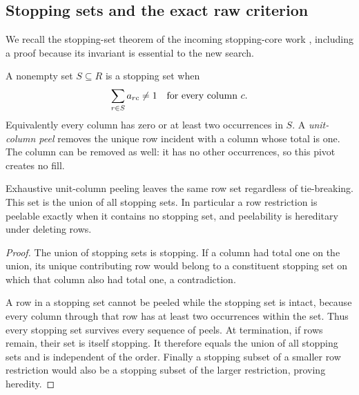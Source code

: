 \subsection{Stopping sets and the exact raw criterion}
We recall the stopping-set theorem of the incoming stopping-core work
\cite{StoppingCores,SaturatedBundles}, including a proof because its invariant
is essential to the new search.

\begin{definition}
A nonempty set $S\subseteq R$ is a stopping set when
\begin{equation}\label{eq:stopping}
          \sum_{r\in S}a_{rc}\ne1
          \quad\hbox{for every column }c.
\end{equation}
Equivalently every column has zero or at least two occurrences in $S$.
A \emph{unit-column peel} removes the unique row incident with a column
whose total is one.  The column can be removed as well: it has no other
occurrences, so this pivot creates no fill.
\end{definition}

\begin{lemma}\label{lem:peeling}
Exhaustive unit-column peeling leaves the same row set regardless of
tie-breaking.  This set is the union of all stopping sets.  In particular
a row restriction is peelable exactly when it contains no stopping set,
and peelability is hereditary under deleting rows.
\end{lemma}
\begin{proof}
The union of stopping sets is stopping.  If a column had total one on the
union, its unique contributing row would belong to a constituent stopping
set on which that column also had total one, a contradiction.

A row in a stopping set cannot be peeled while the stopping set is intact,
because every column through that row has at least two occurrences within
the set.  Thus every stopping set survives every sequence of peels.  At
termination, if rows remain, their set is itself stopping.  It therefore
equals the union of all stopping sets and is independent of the order.
Finally a stopping subset of a smaller row restriction would also be a
stopping subset of the larger restriction, proving heredity.
\end{proof}

